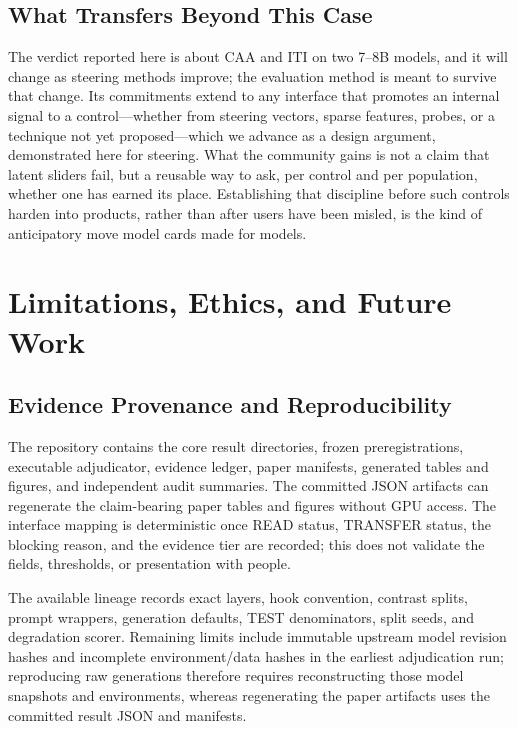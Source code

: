 \documentclass[manuscript,review,anonymous]{acmart}
\begin{document}

\subsection{What Transfers Beyond This Case}\label{what-transfers-beyond-this-case}

The verdict reported here is about CAA and ITI on two 7--8B models, and it will change as steering methods improve; the evaluation method is meant to survive that change. Its commitments extend to any interface that promotes an internal signal to a control---whether from steering vectors, sparse features, probes, or a technique not yet proposed---which we advance as a design argument, demonstrated here for steering. What the community gains is not a claim that latent sliders fail, but a reusable way to ask, per control and per population, whether one has earned its place. Establishing that discipline before such controls harden into products, rather than after users have been misled, is the kind of anticipatory move model cards made for models.

\section{Limitations, Ethics, and Future Work}\label{limitations-ethics-and-future-work}

\subsection{Evidence Provenance and Reproducibility}\label{evidence-provenance-and-reproducibility}

The repository contains the core result directories, frozen preregistrations, executable adjudicator, evidence ledger, paper manifests, generated tables and figures, and independent audit summaries. {}%
The committed JSON artifacts can regenerate the claim-bearing paper tables and figures without GPU access. The interface mapping is deterministic once READ status, TRANSFER status, the blocking reason, and the evidence tier are recorded; this does not validate the fields, thresholds, or presentation with people.

The available lineage records exact layers, hook convention, contrast splits, prompt wrappers, generation defaults, TEST denominators, split seeds, and degradation scorer. {}%
{}%
Remaining limits include immutable upstream model revision hashes and incomplete environment/data hashes in the earliest adjudication run; reproducing raw generations therefore requires reconstructing those model snapshots and environments, whereas regenerating the paper artifacts uses the committed result JSON and manifests.
\end{document}
